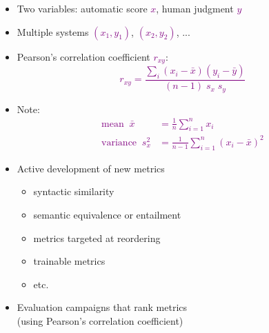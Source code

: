 \documentclass[landscape]{slides}
\newcommand{\maths}[1]{\textcolor{purple}{#1}}
\begin{document}
\begin{itemize}
\item Two variables: automatic score \maths{$x$}, human judgment \maths{$y$}
\item Multiple systems \maths{$(x_1,y_1)$},  \maths{$(x_2,y_2)$}, ...
\item Pearson's correlation coefficient \maths{$r_{xy}$}:\vspace{-3mm}
\maths{\begin{equation*}
r_{xy} = \frac{\sum_i (x_i-\bar{x}) (y_i-\bar{y})}{(n-1) \; s_x \; s_y}
\end{equation*}}
\vspace{-3mm}
\item Note:\vspace{-20mm}
\maths{\begin{equation*}
\begin{split}
\text{mean} \; \; \bar{x} &= \frac{1}{n} \sum_{i=1}^n x_i\\
\text{variance} \; \; s_x^2 &= \frac{1}{n-1} \sum_{i=1}^n (x_i - \bar{x})^2
\end{split}
\end{equation*}}
\end{itemize}


\vspace{20mm}
\begin{itemize} \itemsep 10mm
\item Active development of new metrics
\begin{itemize}
\item syntactic similarity
\item semantic equivalence or entailment
\item metrics targeted at reordering
\item trainable metrics
\item etc.
\end{itemize}
\item Evaluation campaigns that rank metrics\\
(using Pearson's correlation coefficient)
\end{itemize}

\end{document}
